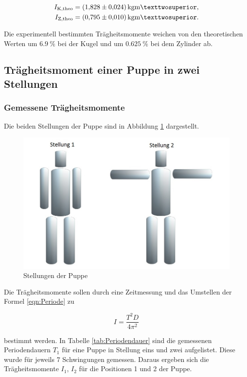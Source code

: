 \begin{align*}
I_\text{K,theo} &= \SI{1.828+-0.024}{\kilo\gram\meter²},\\
I_\text{Z,theo} &= \SI{0.795+-0.010}{\kilo\gram\meter²}.
\end{align*}

Die experimentell bestimmten Trägheitsmomente weichen von den theoretischen
Werten um $\SI{6.9}{\percent}$ bei der Kugel und um $\SI{0.625}{\percent}$ bei dem Zylinder ab.

\subsection{Trägheitsmoment einer Puppe in zwei Stellungen}
\subsubsection{Gemessene Trägheitsmomente}

Die beiden Stellungen der Puppe sind in Abbildung \ref{fig:Stellungen} dargestellt.

\begin{figure}
  \centering
  \includegraphics[scale=0.2]{content/Puppe_Stellungen.jpg}
  \caption{Stellungen der Puppe}
  \label{fig:Stellungen}
\end{figure}

Die Trägheitsmomente sollen durch eine Zeitmessung und das Umstellen der Formel \eqref{eqn:Periode} zu

\begin{equation}
  I = \frac{T^2 D} {4 \pi^2}
\end{equation}

bestimmt werden. In Tabelle \ref{tab:Periodendauer} sind die gemessenen Periodendauern $T_1$ für eine Puppe
in Stellung eins und zwei aufgelistet. Diese wurde für jeweils $7$ Schwingungen gemessen.  
Daraus ergeben sich die Trägheitsmomente $I_1$, $I_2$ für die Positionen 1 und 2 der Puppe.

